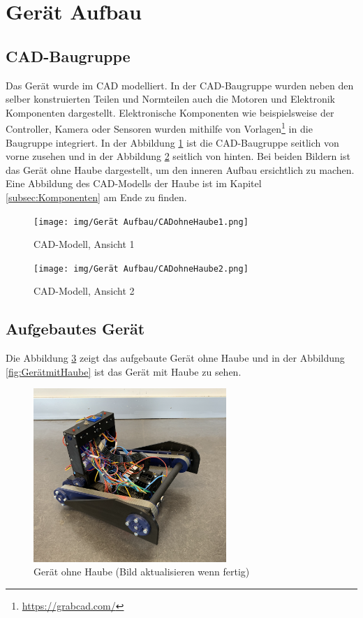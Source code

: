 \section{Gerät Aufbau}

\subsection{CAD-Baugruppe}

Das Gerät wurde im CAD modelliert. In der CAD-Baugruppe wurden neben den selber konstruierten Teilen und Normteilen auch die Motoren und Elektronik Komponenten dargestellt. Elektronische Komponenten wie beispielsweise der Controller, Kamera oder Sensoren wurden mithilfe von Vorlagen\footnote{\url{https://grabcad.com/}} in die Baugruppe  integriert. In der Abbildung \ref{fig:CADohneHaube1} ist die CAD-Baugruppe seitlich von vorne zusehen und in der Abbildung \ref{fig:CADohneHaube2} seitlich von hinten. Bei beiden Bildern ist das Gerät ohne Haube dargestellt, um den inneren Aufbau ersichtlich zu machen. Eine Abbildung des CAD-Modells der Haube ist im Kapitel \ref{subsec:Komponenten} am Ende zu finden.

\begin{figure}[H]
  \texttt{[image: img/Gerät Aufbau/CADohneHaube1.png]}
  \centering
  \caption{CAD-Modell, Ansicht 1}
  \label{fig:CADohneHaube1}
\end{figure}

\begin{figure}[H]
  \texttt{[image: img/Gerät Aufbau/CADohneHaube2.png]}
  \centering
  \caption{CAD-Modell, Ansicht 2}
  \label{fig:CADohneHaube2}
\end{figure}

\subsection{Aufgebautes Gerät}

Die Abbildung \ref{fig:GerätohneHaube} zeigt das aufgebaute Gerät ohne Haube und in der Abbildung \ref{fig:GerätmitHaube} ist das Gerät mit Haube zu sehen. 

\newpage

\begin{figure}[H]
  \includegraphics[width=0.65\textwidth]{img/Gerät Aufbau/GerätohneHaube.png}
  \centering
  \caption{Gerät ohne Haube (Bild aktualisieren wenn fertig)}
  \label{fig:GerätohneHaube}
\end{figure}

